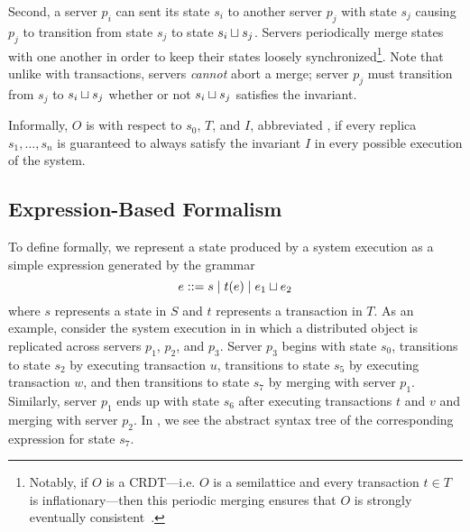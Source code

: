 Second, a server $p_i$ can sent its state $s_i$ to another server $p_j$ with
state $s_j$ causing $p_j$ to transition from state $s_j$  to state $s_i \sqcup
s_j$. Servers periodically merge states with one another in order to keep their
states loosely synchronized\footnote{%
  Notably, if $O$ is a CRDT---i.e. $O$ is a semilattice and every transaction
  $t \in T$ is inflationary---then this periodic merging ensures that $O$ is
  strongly eventually consistent~\cite{shapiro2011conflict}.
}.
Note that unlike with transactions, servers \emph{cannot} abort a merge; server
$p_j$ must transition from $s_j$ to $s_i \sqcup s_j$ whether or not $s_i \sqcup
s_j$ satisfies the invariant.

Informally, $O$ is  with respect to $s_0$, $T$,
and $I$, abbreviated , if every replica $s_1, \ldots,
s_n$ is guaranteed to always satisfy the invariant $I$ in every possible
execution of the system.

\subsection{Expression-Based Formalism}
To define \invariantconfluence{} formally, we represent a state produced by a
system execution as a simple expression generated by the grammar
\[
  e ::= s \mid t(e) \mid e_1 \sqcup e_2
\]
where $s$ represents a state in $S$ and $t$ represents a transaction in $T$. As
an example, consider the system execution in  in which
a distributed object is replicated across servers $p_1$, $p_2$, and $p_3$.
Server $p_3$ begins with state $s_0$, transitions to state $s_2$ by executing
transaction $u$, transitions to state $s_5$ by executing transaction $w$, and
then transitions to state $s_7$ by merging with server $p_1$. Similarly, server
$p_1$ ends up with state $s_6$ after executing transactions $t$ and $v$ and
merging with server $p_2$. In , we see the abstract syntax
tree of the corresponding expression for state $s_7$.

{}

